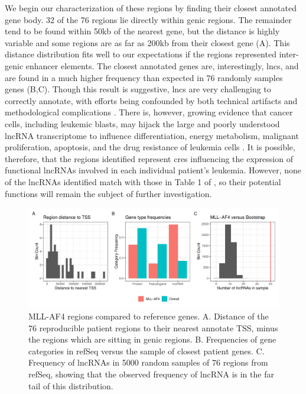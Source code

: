We begin our characterization of these regions by finding their closest annotated gene body. 32 of the 76 regions lie directly within genic regions. The remainder tend to be found within 50kb of the nearest gene, but the distance is highly variable and some regions are as far as 200kb from their closest gene (A). This distance distribution fits well to our expectations if the regions represented inter-genic enhancer elements.  The closest annotated genes are, interestingly, \glspl{lnc}, and are found in a much higher frequency than expected in 76 randomly samples genes (B,C). Though this result is suggestive, \glspl{lnc} are very challenging to correctly annotate, with efforts being confounded by both technical artifacts and methodological complications \cite[see Figure 1 for an overview of challenges associated with lncRNA annotation]{Cao2018}. There is, however, growing evidence that cancer cells, including leukemic blasts, may hijack the large and poorly understood lncRNA transcriptome to influence differentiation, energy metabolism, malignant proliferation, apoptosis, and the drug resistance of leukemia cells \cite[Table 1]{Gao2020}. It is possible, therefore, that the regions identified represent \glspl{cre} influencing the expression of functional lncRNAs involved in each individual patient's leukemia. However, none of the lncRNAs identified match with those in Table 1 of \textcite{Gao20202}, so their potential functions will remain the subject of further investigation.

\begin{figure}
    \centering
    \includegraphics[width=\textwidth]{plot/ch5/mll_lnc.pdf}
    \caption{MLL-AF4 regions compared to reference genes. A. Distance of the 76 reproducible patient regions to their nearest annotate TSS, minus the regions which are sitting in genic regions. B. Frequencies of gene categories in refSeq versus the sample of closest patient genes. C. Frequency of lncRNAs in 5000 random samples of 76 regions from refSeq, showing that the observed frequency of lncRNA is in the far tail of this distribution.}
    \label{fig:mll_lnc}
\end{figure}

